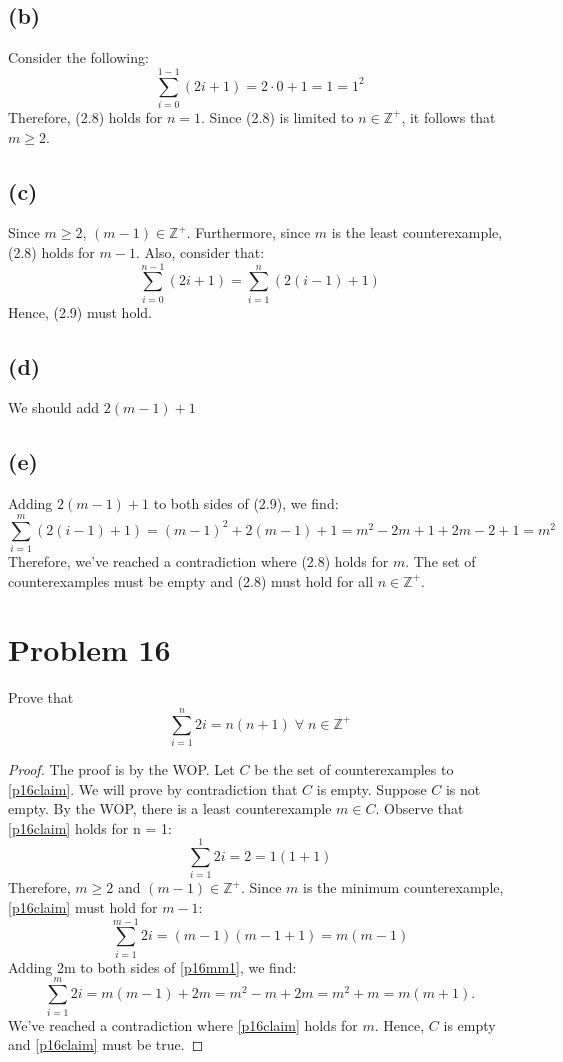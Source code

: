 \documentclass{article}
\begin{document}
\subsection{(b)}
Consider the following:
\[
	\sum_{i=0}^{1-1} (2i + 1) = 2 \cdot 0 + 1 = 1 = 1^2
\]
Therefore, (2.8) holds for $n = 1$. Since (2.8) is limited to $n \in \mathbb{Z^+}$, it follows that $m \ge 2$.

\subsection{(c)}
Since $m \ge 2$, $(m - 1) \in \mathbb{Z^+}$. Furthermore, since $m$ is the least counterexample, (2.8) holds for $m - 1$. Also, consider that:
\[
	\sum_{i=0}^{n-1} (2i + 1) = \sum_{i=1}^{n} (2(i-1)+1)
\]
Hence, (2.9) must hold.

\subsection{(d)}
We should add $2(m - 1) + 1$

\subsection{(e)}
Adding $2(m - 1) + 1$ to both sides of (2.9), we find:
\[
	\sum_{i=1}^m (2(i-1)+1) = (m-1)^2 + 2(m-1) + 1 = m^2 - 2m + 1 + 2m - 2 + 1 = m^2
\]
Therefore, we've reached a contradiction where (2.8) holds for $m$. The set of counterexamples must be empty and (2.8) must hold for all $n \in \mathbb{Z^+}$.

\pagebreak

\section{Problem 16}
Prove that
\begin{equation}\label{p16claim}
	\sum_{i=1}^n 2i = n(n+1) \; \forall \; n \in \mathbb{Z^+}
\end{equation}
\begin{proof}
	The proof is by the WOP. Let $C$ be the set of counterexamples to \eqref{p16claim}. We will prove by contradiction that $C$ is empty. Suppose $C$ is not empty. By the WOP, there is a least counterexample $m \in C$. Observe that \eqref{p16claim} holds for n = 1:
	\[
		\sum_{i=1}^1 2i = 2 = 1(1+1)
	\]
	Therefore, $m \ge 2$ and $(m - 1) \in \mathbb{Z^+}$. Since $m$ is the minimum counterexample, \eqref{p16claim} must hold for $m - 1$:
	\begin{equation}\label{p16mm1}
		\sum_{i=1}^{m-1} 2i = (m-1)(m-1+1) = m(m-1)
	\end{equation}
	Adding 2m to both sides of \eqref{p16mm1}, we find:
	\[
		\sum_{i=1}^m 2i = m(m-1) + 2m = m^2 -m + 2m = m^2 + m = m(m+1).
	\]
	We've reached a contradiction where \eqref{p16claim} holds for $m$. Hence, $C$ is empty and \eqref{p16claim} must be true.
\end{proof}
\end{document}
